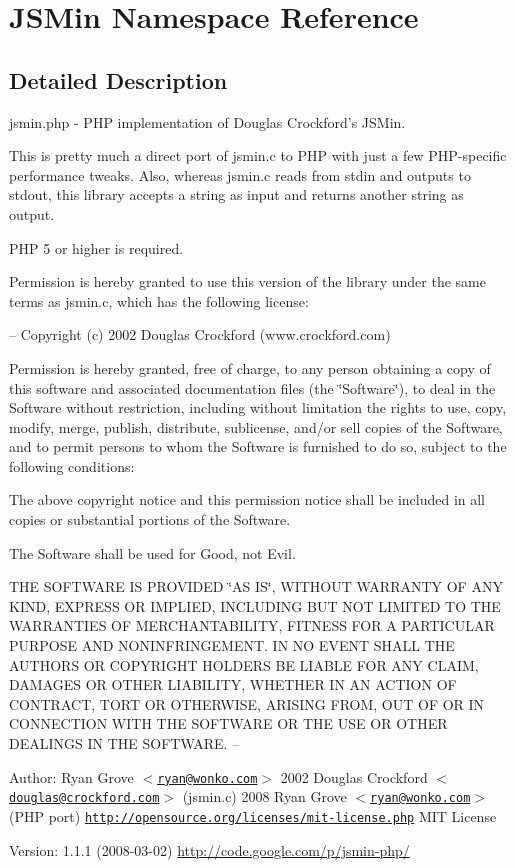 \hypertarget{namespaceJSMin}{
\section{JSMin Namespace Reference}
\label{namespaceJSMin}
}




\subsection{Detailed Description}
jsmin.php - PHP implementation of Douglas Crockford's JSMin.

This is pretty much a direct port of jsmin.c to PHP with just a few PHP-specific performance tweaks. Also, whereas jsmin.c reads from stdin and outputs to stdout, this library accepts a string as input and returns another string as output.

PHP 5 or higher is required.

Permission is hereby granted to use this version of the library under the same terms as jsmin.c, which has the following license:

-- Copyright (c) 2002 Douglas Crockford (www.crockford.com)

Permission is hereby granted, free of charge, to any person obtaining a copy of this software and associated documentation files (the \char`\"{}Software\char`\"{}), to deal in the Software without restriction, including without limitation the rights to use, copy, modify, merge, publish, distribute, sublicense, and/or sell copies of the Software, and to permit persons to whom the Software is furnished to do so, subject to the following conditions:

The above copyright notice and this permission notice shall be included in all copies or substantial portions of the Software.

The Software shall be used for Good, not Evil.

THE SOFTWARE IS PROVIDED \char`\"{}AS IS\char`\"{}, WITHOUT WARRANTY OF ANY KIND, EXPRESS OR IMPLIED, INCLUDING BUT NOT LIMITED TO THE WARRANTIES OF MERCHANTABILITY, FITNESS FOR A PARTICULAR PURPOSE AND NONINFRINGEMENT. IN NO EVENT SHALL THE AUTHORS OR COPYRIGHT HOLDERS BE LIABLE FOR ANY CLAIM, DAMAGES OR OTHER LIABILITY, WHETHER IN AN ACTION OF CONTRACT, TORT OR OTHERWISE, ARISING FROM, OUT OF OR IN CONNECTION WITH THE SOFTWARE OR THE USE OR OTHER DEALINGS IN THE SOFTWARE. --

\begin{Desc}
\item[Author:]Ryan Grove $<$\href{mailto:ryan@wonko.com}{\tt ryan@wonko.com}$>$  2002 Douglas Crockford $<$\href{mailto:douglas@crockford.com}{\tt douglas@crockford.com}$>$ (jsmin.c)  2008 Ryan Grove $<$\href{mailto:ryan@wonko.com}{\tt ryan@wonko.com}$>$ (PHP port)  \href{http://opensource.org/licenses/mit-license.php}{\tt http://opensource.org/licenses/mit-license.php} MIT License \end{Desc}
\begin{Desc}
\item[Version:]1.1.1 (2008-03-02) \hyperlink{}{http://code.google.com/p/jsmin-php/}\end{Desc}
